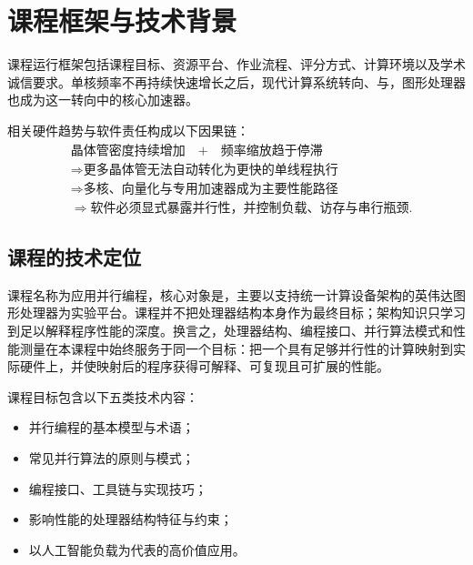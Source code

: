 \section{课程框架与技术背景}

\begin{overviewbox}
课程运行框架包括课程目标、资源平台、作业流程、评分方式、计算环境以及学术诚信要求。单核频率不再持续快速增长之后，现代计算系统转向、与，图形处理器也成为这一转向中的核心加速器。
\end{overviewbox}

相关硬件趋势与软件责任构成以下因果链：
\begin{equation*}
\begin{aligned}
&\text{晶体管密度持续增加}
\quad + \quad
\text{频率缩放趋于停滞}
\\
&\Longrightarrow
\text{更多晶体管无法自动转化为更快的单线程执行}
\\
&\Longrightarrow
\text{多核、向量化与专用加速器成为主要性能路径}
\\
&\Longrightarrow
\text{软件必须显式暴露并行性，并控制负载、访存与串行瓶颈}.
\end{aligned}
\end{equation*}

\subsection{课程的技术定位}

课程名称为应用并行编程，核心对象是，主要以支持统一计算设备架构的英伟达图形处理器为实验平台。课程并不把处理器结构本身作为最终目标；架构知识只学习到足以解释程序性能的深度。换言之，处理器结构、编程接口、并行算法模式和性能测量在本课程中始终服务于同一个目标：把一个具有足够并行性的计算映射到实际硬件上，并使映射后的程序获得可解释、可复现且可扩展的性能。

课程目标包含以下五类技术内容：
\begin{itemize}
  \item 并行编程的基本模型与术语；
  \item 常见并行算法的原则与模式；
  \item 编程接口、工具链与实现技巧；
  \item 影响性能的处理器结构特征与约束；
  \item 以人工智能负载为代表的高价值应用。
\end{itemize}

